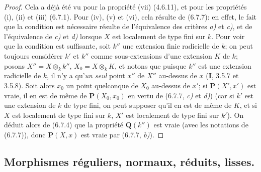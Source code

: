 \begin{proof}
Cela a déjà été vu pour la propriété (vii) (4.6.11), et pour les propriétés
(i), (ii) et (iii) (6.7.1). Pour (iv), (v) et (vi), cela résulte de (6.7.7):
en effet, le fait que la condition est nécessaire résulte de l'équivalence des
critères \emph{a)} et \emph{c)}, et de l'équivalence de \emph{c)} et \emph{d)} lorsque $X$ est localement
de type fini sur $k$. Pour voir que la condition est suffisante, soit $k''$ une
extension finie radicielle de $k$; on peut toujours considérer $k'$ et $k''$
comme sous-extensions d'une extension $K$ de $k$; posons
$X''=X\otimes_k k''$, $X_0=X\otimes_k K$, et notons que puisque $k''$ est une
extension radicielle de $k$, il n'y a qu'\emph{un seul} point $x''$ de $X''$ au-dessus
de $x$ (\textbf{I}, 3.5.7 et 3.5.8). Soit alors $x_0$ un point quelconque de $X_0$
au-dessus de $x'$; si $\boldsymbol{P}(X',x')$ est vraie, il en est de même de $\boldsymbol{P}(X_0,x_0)$
en vertu de (6.7.7, \emph{c)} et \emph{d)}) (car si $k'$ est une extension de $k$ de type
fini, on peut supposer qu'il en est de même de $K$, et si $X$ est localement
de type fini sur $k$, $X'$ est localement de type fini sur $k'$). On déduit
alors de (6.7.4) que la propriété $\boldsymbol{Q}(k'')$ est vraie (avec les notations de
(6.7.7)), donc $\boldsymbol{P}(X,x)$ est vraie par (6.7.7, \emph{b)}).
\end{proof}

\subsection{Morphismes réguliers, normaux, réduits, lisses.}
\label{subsection:IV.6.8}

